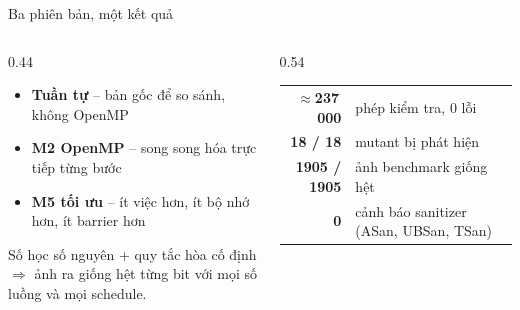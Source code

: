 \documentclass[aspectratio=169,11pt]{beamer}
\newcommand{\bignum}[1]{{\usebeamerfont{title}\color{accent}\textbf{#1}}}
\begin{document}
\begin{frame}{Ba phiên bản, một kết quả}
  \begin{columns}[T]
    \begin{column}{0.44\textwidth}
      \begin{itemize}
        \item \textbf{Tuần tự} -- bản gốc để so sánh, không OpenMP
        \item \textbf{M2 OpenMP} -- song song hóa trực tiếp từng bước
        \item \textbf{M5 tối ưu} -- ít việc hơn, ít bộ nhớ hơn, ít barrier hơn
      \end{itemize}
      \vspace{8pt}
      Số học số nguyên + quy tắc hòa cố định\\
      $\Rightarrow$ \alert{ảnh ra giống hệt từng bit} với mọi số luồng và mọi schedule.
    \end{column}
    \begin{column}{0.54\textwidth}
      \centering\small
      \begin{tabular}{@{}r>{\raggedright\arraybackslash}p{3.3cm}@{}}
        \bignum{$\approx$237\,000} & phép kiểm tra, 0 lỗi \\[4pt]
        \bignum{18 / 18} & mutant bị phát hiện \\[4pt]
        \bignum{1905 / 1905} & ảnh benchmark giống hệt \\[4pt]
        \bignum{0} & cảnh báo sanitizer (ASan, UBSan, TSan) \\
      \end{tabular}
    \end{column}
  \end{columns}
\end{frame}
\end{document}
